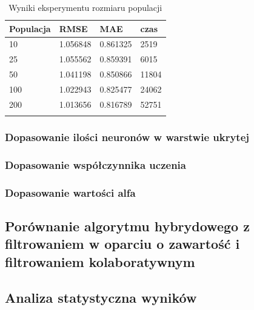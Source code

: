 \documentclass[twoside]{iisthesis}
\begin{document}
		\begin{longtable}{llll}
			\label{tab:exppopulation}
			\centering
			\textbf{Populacja} & \textbf{RMSE} & \textbf{MAE} & \textbf{czas} \\
			\hline
			10        & 1.056848 & 0.861325 & 2519                      \\
			25        & 1.055562 & 0.859391 & 6015                      \\
			50        & 1.041198 & 0.850866 & 11804                     \\
			100       & 1.022943 & 0.825477 & \multicolumn{1}{r}{24062} \\
			200       & 1.013656 & 0.816789 & 52751                     \\
			\caption{Wyniki eksperymentu rozmiaru populacji}
		\end{longtable}
	

		
		\subsubsection{Dopasowanie ilości neuronów w warstwie ukrytej}
		
		
		\subsubsection{Dopasowanie współczynnika uczenia}
		
		
		\subsubsection{Dopasowanie wartości alfa}
		

		\subsection{Porównanie algorytmu hybrydowego z filtrowaniem w oparciu o zawartość i filtrowaniem kolaboratywnym}


		\subsection{Analiza statystyczna wyników}		
\end{document}

